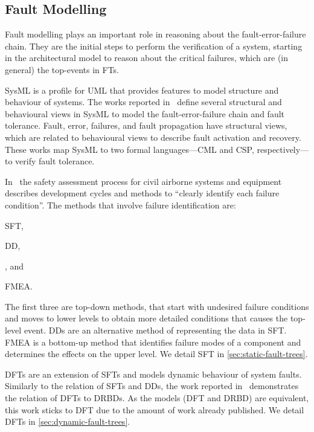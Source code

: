 \documentclass[12pt,openright,twoside,a4paper,oldfontcommands,english,brazil,final]{abntex2}
\theoremstyle{theo}
\begin{document}
\subsection{Fault Modelling}

Fault modelling plays an important role in reasoning about the fault-error-failure chain.
They are the initial steps to perform the verification of a system, starting in the architectural model to reason about the critical failures, which are (in general) the top-events in \acp{FT}.

\Ac{SysML} is a profile for \ac{UML} that provides features to model structure and behaviour of systems.
The works reported in~\cite{APR+2013,ADP+2013} define several structural and behavioural views in \ac{SysML} to model the fault-error-failure chain and fault tolerance.
Fault, error, failures, and fault propagation have structural views, which are related to behavioural views to describe fault activation and recovery.
These works map \ac{SysML} to two formal languages---\ac{CML} and \ac{CSP}, respectively---to verify fault tolerance.

In~\cite{SAE1996b} the safety assessment process for civil airborne systems and equipment describes development cycles and methods to ``clearly identify each failure condition''.
The methods that involve failure identification are:
\begin{alineasinline}
  \item \ac{SFT},
  \item \ac{DD},
  \item {}, and
  \item \ac{FMEA}.
\end{alineasinline}
The first three are top-down methods, that start with undesired failure conditions and moves to lower levels to obtain more detailed conditions that causes the top-level event.
\Acp{DD} are an alternative method of representing the data in \ac{SFT}.
\Ac{FMEA} is a bottom-up method that identifies failure modes of a component and determines the effects on the upper level.
We detail \ac{SFT} in \cref{sec:static-fault-trees}.

\Acp{DFT} are an extension of \acp{SFT} and models dynamic behaviour of system faults.
Similarly to the relation of \acp{SFT} and \acp{DD}, the work reported in~\cite{DP2009} demonstrates the relation of \acp{DFT} to \acp{DRBD}.
As the models (\ac{DFT} and \ac{DRBD}) are equivalent, this work sticks to \ac{DFT} due to the amount of work already published.
We detail \acp{DFT} in \cref{sec:dynamic-fault-trees}.
\end{document}
